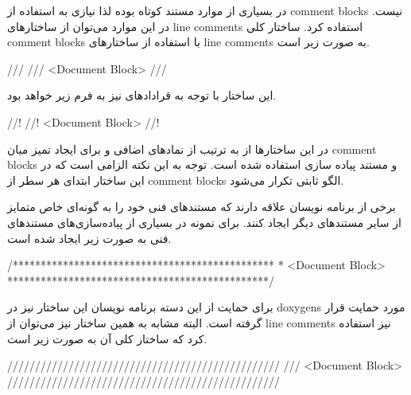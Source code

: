 در بسیاری از موارد مستند کوتاه بوده لذا نیازی به استفاده از \glspl{comment
block} نیست. در این موارد می‌توان از ساختارهای \glspl{line comment} استفاده
کرد. ساختار کلی \glspl{comment block} با استفاده از ساختارهای \glspl{line
comment} به صورت زیر است.

\begin{C++}
///
/// <Document Block>
///
\end{C++}

این ساختار با توجه به قرادادهای  نیز به فرم زیر خواهد بود.

\begin{C++}
//!
//! <Document Block>
//!
\end{C++}

در این ساختارها از به ترتیب از نمادهای اضافی \lr{/} و \lr{!} برای ایجاد تمیز
میان \glspl{comment block} و مستند پیاده سازی استفاده شده است. توجه به این نکته
الزامی است که در این ساختار ابتدای هر سطر از \glspl{comment block} الگو ثابتی
تکرار می‌شود.

برخی از برنامه نویسان علاقه دارند که مستندهای فنی خود را به گونه‌ای خاص متمایز
از سایر مستندهای دیگر ایجاد کنند. برای نمونه در بسیاری از پیاده‌سازی‌های
مستندهای فنی به صورت زیر ایجاد شده است.

\begin{C++}
/***********************************************
 *  <Document Block>
 ***********************************************/
\end{C++}

برای حمایت از این دسته برنامه نویسان این ساختار نیز در \glspl{doxygen} مورد
حمایت قرار گرفته است. البته مشابه به همین ساختار نیز می‌توان از \glspl{line
comment} نیز استفاده کرد که ساختار کلی آن به صورت زیر است.

\begin{C++}
/////////////////////////////////////////////////
/// <Document Block>
/////////////////////////////////////////////////
\end{C++}


